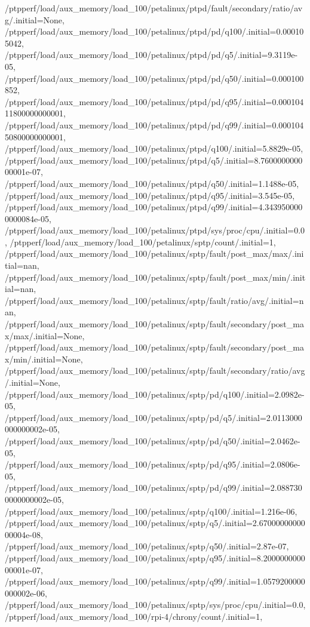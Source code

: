 {    /ptpperf/load/aux_memory/load_100/petalinux/ptpd/fault/secondary/ratio/avg/.initial=None,
    /ptpperf/load/aux_memory/load_100/petalinux/ptpd/pd/q100/.initial=0.000105042,
    /ptpperf/load/aux_memory/load_100/petalinux/ptpd/pd/q5/.initial=9.3119e-05,
    /ptpperf/load/aux_memory/load_100/petalinux/ptpd/pd/q50/.initial=0.000100852,
    /ptpperf/load/aux_memory/load_100/petalinux/ptpd/pd/q95/.initial=0.00010411800000000001,
    /ptpperf/load/aux_memory/load_100/petalinux/ptpd/pd/q99/.initial=0.00010450800000000001,
    /ptpperf/load/aux_memory/load_100/petalinux/ptpd/q100/.initial=5.8829e-05,
    /ptpperf/load/aux_memory/load_100/petalinux/ptpd/q5/.initial=8.760000000000001e-07,
    /ptpperf/load/aux_memory/load_100/petalinux/ptpd/q50/.initial=1.1488e-05,
    /ptpperf/load/aux_memory/load_100/petalinux/ptpd/q95/.initial=3.545e-05,
    /ptpperf/load/aux_memory/load_100/petalinux/ptpd/q99/.initial=4.3439500000000084e-05,
    /ptpperf/load/aux_memory/load_100/petalinux/ptpd/sys/proc/cpu/.initial=0.0,
    /ptpperf/load/aux_memory/load_100/petalinux/sptp/count/.initial=1,
    /ptpperf/load/aux_memory/load_100/petalinux/sptp/fault/post_max/max/.initial=nan,
    /ptpperf/load/aux_memory/load_100/petalinux/sptp/fault/post_max/min/.initial=nan,
    /ptpperf/load/aux_memory/load_100/petalinux/sptp/fault/ratio/avg/.initial=nan,
    /ptpperf/load/aux_memory/load_100/petalinux/sptp/fault/secondary/post_max/max/.initial=None,
    /ptpperf/load/aux_memory/load_100/petalinux/sptp/fault/secondary/post_max/min/.initial=None,
    /ptpperf/load/aux_memory/load_100/petalinux/sptp/fault/secondary/ratio/avg/.initial=None,
    /ptpperf/load/aux_memory/load_100/petalinux/sptp/pd/q100/.initial=2.0982e-05,
    /ptpperf/load/aux_memory/load_100/petalinux/sptp/pd/q5/.initial=2.0113000000000002e-05,
    /ptpperf/load/aux_memory/load_100/petalinux/sptp/pd/q50/.initial=2.0462e-05,
    /ptpperf/load/aux_memory/load_100/petalinux/sptp/pd/q95/.initial=2.0806e-05,
    /ptpperf/load/aux_memory/load_100/petalinux/sptp/pd/q99/.initial=2.0887300000000002e-05,
    /ptpperf/load/aux_memory/load_100/petalinux/sptp/q100/.initial=1.216e-06,
    /ptpperf/load/aux_memory/load_100/petalinux/sptp/q5/.initial=2.6700000000000004e-08,
    /ptpperf/load/aux_memory/load_100/petalinux/sptp/q50/.initial=2.87e-07,
    /ptpperf/load/aux_memory/load_100/petalinux/sptp/q95/.initial=8.200000000000001e-07,
    /ptpperf/load/aux_memory/load_100/petalinux/sptp/q99/.initial=1.0579200000000002e-06,
    /ptpperf/load/aux_memory/load_100/petalinux/sptp/sys/proc/cpu/.initial=0.0,
    /ptpperf/load/aux_memory/load_100/rpi-4/chrony/count/.initial=1,
}
